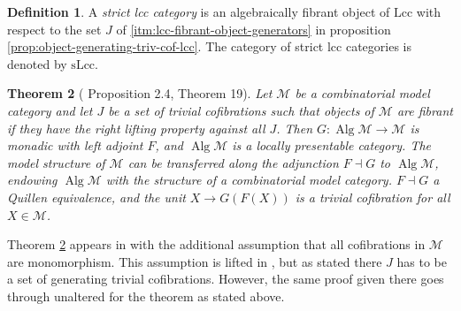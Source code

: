 \documentclass[a4paper]{article}
\newtheorem{theorem}{Theorem}
\theoremstyle{remark}
\theoremstyle{definition}
\newtheorem{definition}[theorem]{Definition}
\begin{document}
\begin{definition}
  A \emph{strict lcc category} is an algebraically fibrant object of $\mathrm{Lcc}$ with respect to the set $J$ of \ref{itm:lcc-fibrant-object-generators} in proposition \ref{prop:object-generating-triv-cof-lcc}.
  The category of strict lcc categories is denoted by $\mathrm{sLcc}$.
\end{definition}


\begin{theorem}[\cite{algebraic-models} Proposition 2.4, \cite{equipping-weak-equivalences} Theorem 19]
  \label{th:algebraically-fibrant-model-category}
  Let $\mathcal{M}$ be a combinatorial model category and let $J$ be a set of trivial cofibrations such that objects of $\mathcal{M}$ are fibrant if they have the right lifting property against all $J$.
  Then $G : \operatorname{Alg} \mathcal{M} \rightarrow \mathcal{M}$ is monadic with left adjoint $F$, and $\operatorname{Alg} \mathcal{M}$ is a locally presentable category.
  The model structure of $\mathcal{M}$ can be transferred along the adjunction $F \dashv G$ to $\operatorname{Alg} \mathcal{M}$, endowing $\operatorname{Alg} \mathcal{M}$ with the structure of a combinatorial model category.
  $F \dashv G$ a Quillen equivalence, and the unit $X \rightarrow G(F(X))$ is a trivial cofibration for all $X \in \mathcal{M}$.
\end{theorem}
Theorem \ref{th:algebraically-fibrant-model-category} appears in \cite{algebraic-models} with the additional assumption that all cofibrations in $\mathcal{M}$ are monomorphism.
This assumption is lifted in \cite{equipping-weak-equivalences}, but as stated there $J$ has to be a set of generating trivial cofibrations.
However, the same proof given there goes through unaltered for the theorem as stated above.
\end{document}
